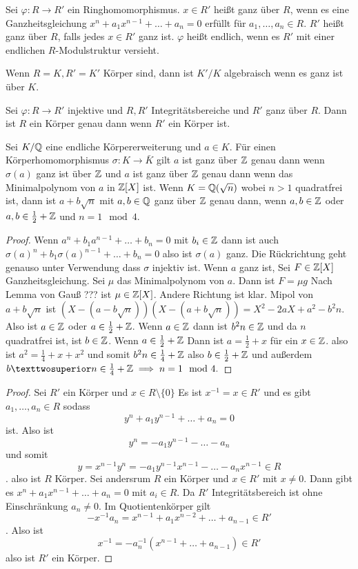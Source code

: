 \begin{Def}
    Sei \(\varphi\colon R\to R'\) ein Ringhomomorphismus. \(x\in R'\) heißt ganz über \(R\), wenn es eine Ganzheitsgleichung \(x^n+a_1x^{n-1}+\dots+a_n=0\) erfüllt für \(a_1,\dots,a_n\in R\).
    \(R'\) heißt ganz über \(R\), falls jedes \(x\in R'\) ganz ist. \(\varphi\) heißt endlich, wenn es \(R'\) mit einer endlichen \(R\)-Modulstruktur versieht.
\end{Def}
\begin{Bsp}
    Wenn \(R=K, R'=K'\) Körper sind, dann ist \(K'/K\) algebraisch wenn es ganz ist über \(K\).
\end{Bsp}
\begin{Lemma}\label{Lem:GanzheitKörper}
    Sei \(\varphi\colon R\to R'\) injektive und \(R,R'\) Integritätsbereiche und \(R'\) ganz über \(R\). Dann ist \(R\) ein Körper genau dann wenn \(R'\) ein Körper ist. 
\end{Lemma}
\begin{Bsp}
     Sei \(K/\mathbb{Q}\) eine endliche Körpererweiterung und \(a\in K\). Für einen Körperhomomorphismus \(\sigma\colon K\to\bar K\) gilt \(a\) ist ganz über \(\mathbb{Z}\) genau dann wenn \(\sigma(a)\) ganz ist über \(\mathbb{Z}\) und \(a\) ist ganz über \(\mathbb{Z}\) genau dann wenn das Minimalpolynom von \(a\) in \(\mathbb{Z}[X]\) ist. Wenn \(K=\mathbb{Q}(\sqrt{n})\) wobei \(n>1\) quadratfrei ist, dann ist \(a+b\sqrt{n}\) mit \(a,b\in \mathbb{Q}\) ganz über \(\mathbb{Z}\) genau dann, wenn \(a,b\in\mathbb{Z}\) oder \(a,b\in\frac 1 2+\mathbb{Z}\) und \(n=1\mod 4\).
\end{Bsp}
\begin{proof}
    Wenn \(a^n+b_1a^{n-1}+\dots+b_n=0\) mit \(b_i\in\mathbb{Z}\) dann ist auch \(\sigma(a)^n+b_1\sigma(a)^{n-1}+\dots+b_n=0\) also ist \(\sigma(a)\) ganz. Die Rückrichtung geht genauso unter Verwendung dass \(\sigma\) injektiv ist.
    Wenn \(a\) ganz ist, Sei \(F\in \mathbb{Z}[X]\) Ganzheitsgleichung. Sei \(\mu\) das Minimalpolynom von \(a\). Dann ist \(F=\mu g\)
    Nach Lemma von Gauß ??? ist \(\mu\in\mathbb{Z}[X]\).
    Andere Richtung ist klar.
    Mipol von \(a+b\sqrt{n}\) ist \((X-(a-b\sqrt{n}))(X-(a+b\sqrt n))=X^2-2aX+a^2-b^2n\).
    Also ist \(a\in \mathbb{Z}\) oder \(a\in  \frac 1 2+\mathbb{Z}\).
    Wenn \(a\in\mathbb{Z}\) dann ist \(b^2n\in\mathbb{Z}\) und da \(n\) quadratfrei ist, ist \(b\in\mathbb{Z}\). 
    Wenn \(a\in \frac 1 2+\mathbb{Z}\) Dann ist \(a=\frac 1 2+x\) für ein \(x\in\mathbb{Z}\).
    also ist \(a^2=\frac 1 4+x+x^2\) und somit \(b^2n\in \frac 1 4+\mathbb{Z}\) also \(b\in \frac 1 2+\mathbb{Z}\) und außerdem \(b²n\in \frac 1 4+\ZZ\implies n=1\mod 4.\)
\end{proof}
\begin{proof}
    Sei \(R'\) ein Körper und \(x\in R\setminus\{0\}\) Es ist \(x^{-1}=x\in R'\) und es gibt \(a_1,\dots,a_n\in R\) sodass \[y^n+a_1y^{n-1}+\dots+a_n=0\] ist. Also ist 
    \[y^n=-a_1y^{n-1}-\dots-a_n\] und somit \[y=x^{n-1}y^n=-a_1y^{n-1}x^{n-1}-\dots -a_nx^{n-1}\in R\].
    also ist \(R\) Körper.
    Sei andersrum \(R\) ein Körper und \(x\in R'\) mit \(x\neq 0\).
    Dann gibt es \(x^n+a_1x^{n-1}+\dots+a_n=0\) mit \(a_i\in R\).
    Da \(R'\) Integritätsbereich ist ohne Einschränkung \(a_n\neq 0\).
    Im Quotientenkörper gilt \[-x^{-1}a_n=x^{n-1}+a_1x^{n-2}+\dots+a_{n-1}\in R'\]. Also ist \[x^{-1}=-a_n^{-1}(x^{n-1}+\dots +a_{n-1})\in R'\] also ist \(R'\) ein Körper.
\end{proof}
